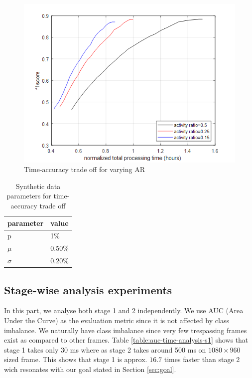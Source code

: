 \begin{figure}
    \centering
    \includegraphics[width=\linewidth]{images/time-acc-tradeoff-ar-mog.png}
    \caption{Time-accuracy trade off for varying AR}
    \label{fig:time-acc-tradeoff-ar-mog}
\end{figure}

\begin{table}
\centering
\caption{Synthetic data parameters for time-accuracy trade off} \vspace{5pt}
\label{table:fig1_data_params}
\begin{tabular}{|l|l|}
\hline
parameter             & value  \\ \hline \hline
p                     & 1\%    \\ 
$\mu$    & 0.50\% \\ 
$\sigma$ & 0.20\% \\ \hline
\end{tabular}
\end{table}

\subsection{Stage-wise analysis experiments}
In this part, we analyse both stage 1 and 2 independently. We use AUC (Area Under the Curve) as the evaluation metric since it is not affected by class imbalance. We naturally have class imbalance since very few trespassing frames exist as compared to other frames. Table \ref{table:auc-time-analysis-s1} shows that stage 1 takes only 30 ms where as stage 2 takes around 500 ms on $1080 \times 960$ sized frame. This shows that stage 1 is approx. $16.7$ times faster than stage 2 wich resonates with our goal stated in Section \ref{sec:goal}. 

